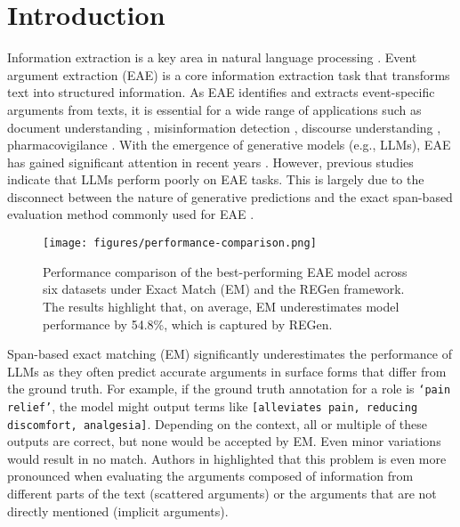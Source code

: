 \section{Introduction}
Information extraction is a key area in natural language processing \cite{gaizauskas-wilks-1998-information}. Event argument extraction (EAE) is a core information extraction task that transforms text into structured information. As EAE identifies and extracts event-specific arguments from texts, it is essential for a wide range of applications such as document understanding \cite{tong-etal-2022-docee}, misinformation detection \cite{wu-etal-2022-cross}, discourse understanding \cite{sharif-etal-2024-explicit}, pharmacovigilance \cite{sun-etal-2022-phee}. With the emergence of generative models (e.g., LLMs), EAE has gained significant attention in recent years \cite{zhang-etal-2024-ultra,zhang-etal-2025-survey}. However, previous studies \cite{gao2023exploringfeasibilitychatgptevent, sun-etal-2024-leveraging} indicate that LLMs perform poorly on EAE tasks. This is largely due to the disconnect between the nature of generative predictions and the exact span-based evaluation method commonly used for EAE \cite{huang-etal-2024-textee}.

\begin{figure}[h!]
  \centering
  \texttt{[image: figures/performance-comparison.png]}
 \caption{Performance comparison of the best-performing EAE model across six datasets under Exact Match (EM) and the REGen framework. The results highlight that, on average, EM underestimates model performance by 54.8\%, which is captured by REGen.}
 \label{intro-example-post}
\end{figure}

Span-based exact matching (EM) significantly underestimates the performance of LLMs as they often predict accurate arguments in surface forms that differ from the ground truth. For example, if the ground truth annotation for a role is \texttt{`pain relief'}, the model might output terms like \texttt{[alleviates pain, reducing discomfort, analgesia]}. Depending on the context, all or multiple of these outputs are correct, but none would be accepted by EM. Even minor variations would result in no match. Authors in \cite{sharif-etal-2024-explicit} highlighted that this problem is even more pronounced when evaluating the arguments composed of information from different parts of the text (scattered arguments) or the arguments that are not directly mentioned (implicit arguments).


